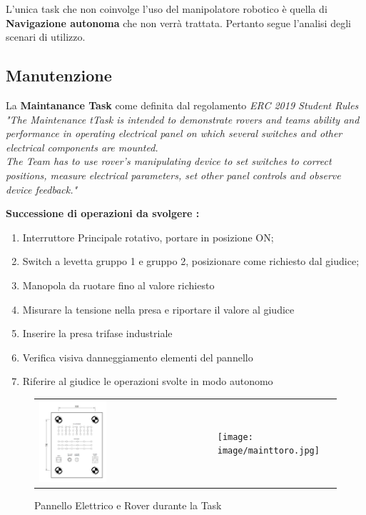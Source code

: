 \documentclass[%
corpo=11pt,
twoside,
 stile=classica,
oldstyle,
greek,%
]{toptesi}
\begin{document}
		L'unica task che non coinvolge l'uso del manipolatore robotico è quella di \textbf{Navigazione autonoma} che non verrà trattata. 
		Pertanto segue l'analisi degli scenari di utilizzo. 
		\subsection{Manutenzione}
		La  \textbf{Maintanance Task} come definita dal regolamento 
		\textit{ERC 2019 Student Rules} \cite{ERC2019} 
		\newline
		\textit{"The Maintenance tTask is intended to demonstrate rovers and teams ability and performance in operating electrical panel on which several switches and other electrical components are mounted. \\
		The Team has to use rover’s manipulating device to set switches to correct positions, measure electrical parameters, set other panel controls and observe device feedback."}

		\newline
		\textbf{Successione di operazioni da svolgere :}
		\begin{enumerate}
		\item Interruttore Principale rotativo, portare in posizione ON;
		\item Switch a levetta gruppo 1 e gruppo 2, posizionare come richiesto dal giudice;
		\item Manopola da ruotare fino al valore richiesto
		\item Misurare la tensione nella presa e riportare il valore al giudice
		\item Inserire la presa trifase industriale
		\item Verifica visiva danneggiamento elementi del pannello 
		\item Riferire al giudice le operazioni svolte in modo autonomo	 
		\end{enumerate}
	
		\begin{figure}
		\centering
		\begin{tabular}{ll}
		\includegraphics[width=0.4\textwidth]{image/panel.png}
		&
		\texttt{[image: image/mainttoro.jpg]}
		\end{tabular}
		\caption{Pannello Elettrico e Rover durante la Task}
		\label{fig:maintanance}
		\end{figure}
	
\end{document}

